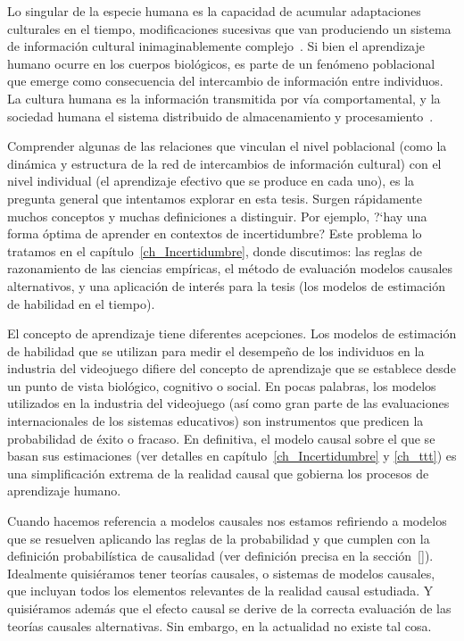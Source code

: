 \documentclass[a4paper,11pt]{book}
\theoremstyle{definition}
\begin{document}

Lo singular de la especie humana es la capacidad de acumular adaptaciones culturales en el tiempo, modificaciones sucesivas que van produciendo un sistema de informaci\'on cultural inimaginablemente complejo~\cite{Tomasello1993, Boyd2011}.
%
Si bien el aprendizaje humano ocurre en los cuerpos biol\'ogicos, es parte de un fen\'omeno poblacional que emerge como consecuencia del intercambio de informaci\'on entre individuos.
%
La cultura humana es la informaci\'on transmitida por v\'ia comportamental, y la sociedad humana el sistema distribuido de almacenamiento y procesamiento~\cite{Derex2020}.


Comprender algunas de las relaciones que vinculan el nivel poblacional (como la din\'amica y estructura de la red de intercambios de informaci\'on cultural) con el nivel individual (el aprendizaje efectivo que se produce en cada uno), es la pregunta general que intentamos explorar en esta tesis.
%
Surgen r\'apidamente muchos conceptos y muchas definiciones a distinguir.
%
Por ejemplo, ?`hay una forma \'optima de aprender en contextos de incertidumbre?
%
Este problema lo tratamos en el cap\'itulo~\ref{ch_Incertidumbre}, donde discutimos: las reglas de razonamiento de las ciencias emp\'iricas, el m\'etodo de evaluaci\'on modelos causales alternativos, y una aplicaci\'on de inter\'es para la tesis (los modelos de estimaci\'on de habilidad en el tiempo).


El concepto de aprendizaje tiene diferentes acepciones.
Los modelos de estimaci\'on de habilidad que se utilizan para medir el desempe\~no de los individuos en la industria del videojuego difiere del concepto de aprendizaje que se establece desde un punto de vista biol\'ogico, cognitivo o social.
%
En pocas palabras, los modelos utilizados en la industria del videojuego (as\'i como gran parte de las evaluaciones internacionales de los sistemas educativos) son instrumentos que predicen la probabilidad de \'exito o fracaso.
%
En definitiva, el modelo causal sobre el que se basan sus estimaciones (ver detalles en cap\'itulo~\ref{ch_Incertidumbre} y \ref{ch_ttt}) es una simplificaci\'on extrema de la realidad causal que gobierna los procesos de aprendizaje humano.


Cuando hacemos referencia a modelos causales nos estamos refiriendo a modelos que se resuelven aplicando las reglas de la probabilidad y que cumplen con la definici\'on probabil\'istica de causalidad (ver definici\'on precisa en la secci\'on~\ref{}).
%
Idealmente quisi\'eramos tener teor\'ias causales, o sistemas de modelos causales, que incluyan todos los elementos relevantes de la realidad causal estudiada.
%
Y quisi\'eramos adem\'as que el efecto causal se derive de la correcta evaluaci\'on de las teor\'ias causales alternativas.
%
Sin embargo, en la actualidad no existe tal cosa.
\end{document}
